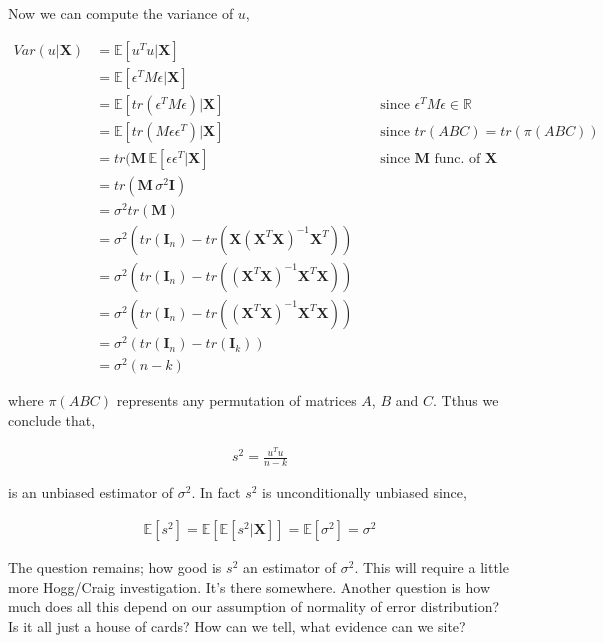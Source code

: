 Now we can compute the variance of $u$,

\begin{align*}
Var(u | \mathbf{X}) &= \mathbb{E}[u^Tu | \mathbf{X}]\\
&= \mathbb{E}[\epsilon^TM\epsilon | \mathbf{X}]\\
&= \mathbb{E}[tr(\epsilon^TM\epsilon) | \mathbf{X}] && \text{ since } \epsilon^TM\epsilon \in \mathbb{R}\\
&= \mathbb{E}[tr(M\epsilon\epsilon^T) | \mathbf{X}] && \text{ since } tr(ABC) = tr(\pi(ABC))\\
&= tr(\mathbf{M}\,\mathbb{E}[\epsilon\epsilon^T | \mathbf{X}] && \text{ since } \mathbf{M} \text{ func. of } \mathbf{X}\\
&= tr(\mathbf{M}\,\sigma^2\mathbf{I})\\
&= \sigma^2tr(\mathbf{M})\\
&= \sigma^2(tr(\mathbf{I}_n) - tr(\mathbf{X}(\mathbf{X}^T\mathbf{X})^{-1}\mathbf{X}^T))\\
&= \sigma^2(tr(\mathbf{I}_n) - tr((\mathbf{X}^T\mathbf{X})^{-1}\mathbf{X}^T\mathbf{X}))\\
&= \sigma^2(tr(\mathbf{I}_n) - tr((\mathbf{X}^T\mathbf{X})^{-1}\mathbf{X}^T\mathbf{X}))\\
&= \sigma^2(tr(\mathbf{I}_n) - tr(\mathbf{I}_k))\\
&= \sigma^2(n - k)
\end{align*}

where $\pi(ABC)$ represents any permutation of matrices $A$, $B$ and $C$. Tthus we conclude that,

\begin{align}
s^2 = \frac{u^Tu}{n - k}
\end{align}

is an unbiased estimator of $\sigma^2$. In fact $s^2$ is unconditionally unbiased since,

\begin{align*}
\mathbb{E}[s^2] = \mathbb{E}[\mathbb{E}[s^2 | \mathbf{X}]] = \mathbb{E}[\sigma^2] = \sigma^2
\end{align*}

The question remains; how good is $s^2$ an estimator of $\sigma^2$. This will require a little more Hogg/Craig investigation. It's there somewhere. Another question is how much does all this depend on our assumption of normality of error distribution? Is it all just a house of cards? How can we tell, what evidence can we site?
